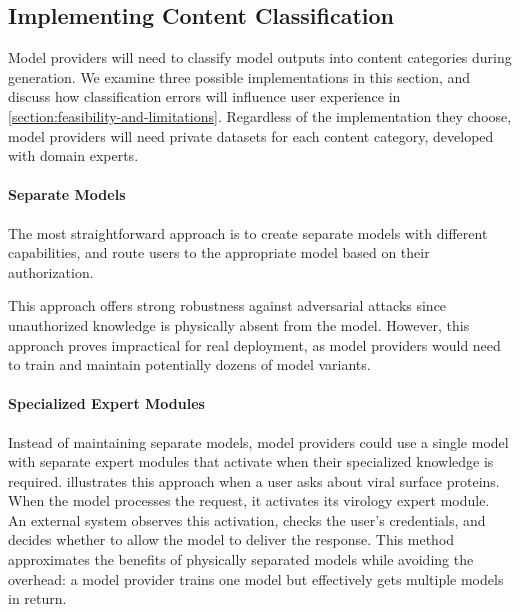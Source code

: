 \documentclass{article}
\theoremstyle{plain}
\theoremstyle{definition}
\theoremstyle{remark}
\begin{document}
\subsection{Implementing Content Classification} \label{section:content-classification}

Model providers will need to classify model outputs into content categories during generation.
We examine three possible implementations in this section, and discuss how classification errors will influence user experience in \cref{section:feasibility-and-limitations}.
Regardless of the implementation they choose, model providers will need private datasets for each content category, developed with domain experts.

\paragraph{Separate Models}

The most straightforward approach is to create separate models with different capabilities, and route users to the appropriate model based on their authorization.

This approach offers strong robustness against adversarial attacks since unauthorized knowledge is physically absent from the model.
However, this approach proves impractical for real deployment, as model providers would need to train and maintain potentially dozens of model variants.

\paragraph{Specialized Expert Modules}

Instead of maintaining separate models, model providers could use a single model with separate expert modules that activate when their specialized knowledge is required.
 illustrates this approach when a user asks about viral surface proteins.
When the model processes the request, it activates its virology expert module.
An external system observes this activation, checks the user's credentials, and decides whether to allow the model to deliver the response.
This method approximates the benefits of physically separated models while avoiding the overhead: a model provider trains one model but effectively gets multiple models in return.
\end{document}
